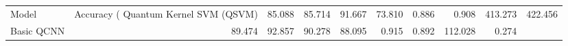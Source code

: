 \begin{tabular}{lrrrrrrrr}
\toprule
Model & Accuracy (%
\midrule
Quantum Kernel SVM (QSVM) & 85.088 & 85.714 & 91.667 & 73.810 & 0.886 & 0.908 & 413.273 & 422.456 \\
Basic QCNN & 89.474 & 92.857 & 90.278 & 88.095 & 0.915 & 0.892 & 112.028 & 0.274 \\
\bottomrule
\end{tabular}
